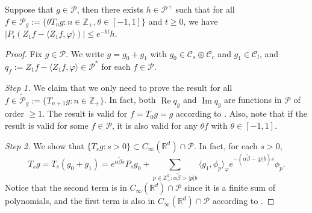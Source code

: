 \documentclass[EJP]{ejpecp} %
\begin{document}
\begin{lemma}
\label{lem:P:R}
	Suppose that $g \in \mathcal P$, then there exists $h \in \mathcal P^+$ such that for all $ f \in \mathcal P_g := \{\theta T_n g: n \in \mathbb Z_+, \theta \in [-1,1]\} $ and $t\geq 0$, we have $ | P_t (Z_1 f - \langle Z_1 f, \varphi \rangle )| \leq e^{-bt} h$.
\end{lemma}
\begin{proof}
	Fix $g \in \mathcal P$.
	We write  $g = g_0 + g_1$ with $g_0 \in \mathcal C_s \oplus \mathcal C_c$ and $g_1 \in \mathcal C_l$,  and $q_f:=Z_1f - \langle Z_1f, \varphi \rangle\in \mathcal P^*$ for each $f\in \mathcal P$.

	
	\emph{Step 1.} We claim  that we only need to prove the result for all $f \in \widetilde{\mathcal P}_g:= \{T_{n+1} g : n \in \mathbb Z_+\}$.
  	In fact, both $\operatorname{Re} q_g$ and $\operatorname{Im} q_g$ are functions in $\mathcal P$ of order $\geq 1$.
  	The result is valid for $f = T_0 g = g$ according to \cite[Fact 1.2]{MarksMilos2018CLT}.
  	Also, note that if the result is valid for some $f \in \mathcal P$, it is also valid for any $\theta f$ with $\theta \in [-1,1]$.

	\emph{Step 2.} We show that $\{T_s g: s> 0\} \subset C_\infty (\mathbb R^d) \cap \mathcal P$.
	In fact, for each $s > 0$,
\[
    T_s g
    = T_s (g_0 + g_1)
    = e^{\alpha \tilde \beta s}P_s g_0 + \sum_{p \in \mathbb Z_+^d: \alpha \tilde \beta > |p|b}
    \langle g_1, \phi_p \rangle_\varphi e^{-(\alpha \tilde \beta - |p|b)s} \phi_p.
\]
	Notice that the second term is in $C_\infty(\mathbb R^d)\cap \mathcal P$ since it is a finite sum of polynomials, and the first term is also in $C_\infty (\mathbb R^d) \cap \mathcal P$ according to \cite[Fact 1.1]{MarksMilos2018CLT}.


\end{proof}
\end{document}
